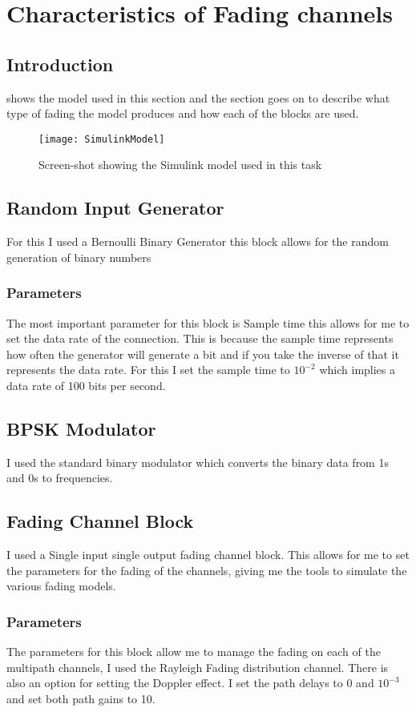 \section{Characteristics of Fading channels}{
	\subsection{Introduction}{
		 shows the model used in this section and the section goes on to describe what type of fading the model produces and how each of the blocks are used.
		\begin{figure}
			\centering
			\texttt{[image: SimulinkModel]}
			\caption{Screen-shot showing the Simulink model used in this task}
			\label{img:SimulinkModel}
		\end{figure}
	}
	\subsection{Random Input Generator}
	{
		For this I used a Bernoulli Binary Generator this block allows for the random generation of binary numbers
		\subsubsection{Parameters}
		{
			The most important parameter for this block is Sample time this allows for me to set the data rate of the connection. This is because the sample time represents how often the generator will generate a bit and if you take the inverse of that it represents the data rate. For this I set the sample time to $10^{-2}$ which implies a data rate of 100 bits per second.
		}
	}
	\subsection{BPSK Modulator}
	{
		I used the standard binary modulator which converts the binary data from 1s and 0s to frequencies.
	}
	\subsection{Fading Channel Block}
	{
		I used a Single input single output fading channel block. This allows for me to set the parameters for the fading of the channels, giving me the tools to simulate the various fading models.
		\subsubsection{Parameters}
		{
			The parameters for this block allow me to manage the fading on each of the multipath channels, I used the Rayleigh Fading distribution channel. There is also an option for setting the Doppler effect. I set the path delays to 0 and $10^{-3}$ and set both path gains to 10. 
		}
	}
}

